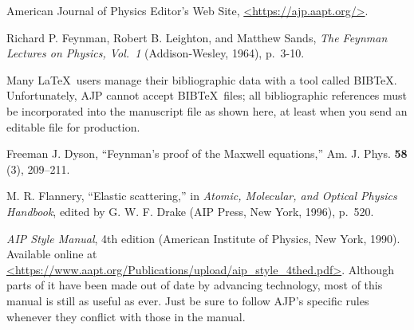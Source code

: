 \documentclass[prb,preprint]{revtex4-2}
\begin{document}
\begin{thebibliography}{99}

 American Journal of Physics Editor's Web Site, 
\url{<https://ajp.aapt.org/>}.

 Richard P. Feynman, Robert B. Leighton, and Matthew Sands, 
\textit{The Feynman Lectures on Physics, Vol.\ 1} (Addison-Wesley, 1964), p.~3-10.

 Many \LaTeX\ users manage their bibliographic data with 
a tool called BIB\TeX.  Unfortunately, AJP cannot accept BIB\TeX\ files; all 
bibliographic references must be incorporated into the manuscript file
as shown here, at least when you send an editable file for production.

 Freeman J. Dyson, ``Feynman's proof of the Maxwell equations,''
Am. J. Phys. \textbf{58} (3), 209--211.  

 M. R. Flannery, ``Elastic scattering,'' in 
\textit{Atomic, Molecular, and Optical Physics Handbook}, edited by
G. W. F. Drake (AIP Press, New York, 1996), p.~520.

 \textit{AIP Style Manual}, 4th edition (American 
Institute of Physics, New York, 1990). Available online at 
\url{<https://www.aapt.org/Publications/upload/aip_style_4thed.pdf>}. Although parts of 
it have been made out of date by advancing technology, most of this manual 
is still as useful as ever. Just be sure to follow AJP's specific rules
whenever they conflict with those in the manual.

\end{thebibliography}
\end{document}
